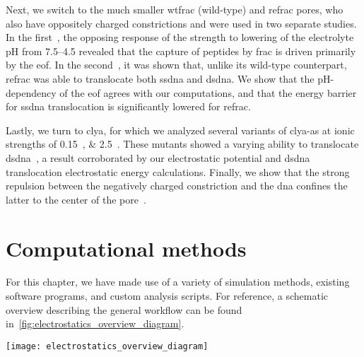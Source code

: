 Next, we switch to the much smaller \gls{wtfrac} (wild-type) and \gls{refrac} pores, who also have oppositely
charged constrictions and were used in two separate studies. In the first~\cite{Huang-2017}, the opposing
response of the  strength to lowering of the electrolyte pH from \numrange{7.5}{4.5} revealed
that the capture of peptides by \gls{frac} is driven primarily by the \gls{eof}. In the
second~\cite{Wloka-2016}, it was shown that, unlike its wild-type counterpart, \gls{refrac} was able to
translocate both \gls{ssdna} and \gls{dsdna}. We show that the pH-dependency of the \gls{eof} agrees with our
computations, and that the energy barrier for \gls{ssdna} translocation is significantly lowered for
\gls{refrac}.

Lastly, we turn to \gls{clya}, for which we analyzed several variants of \gls{clya-as} at ionic strengths of
\SIlist{0.15;2.5}{\Molar}. These mutants showed a varying ability to translocate
\gls{dsdna}~\cite{Franceschini-2016}, a result corroborated by our electrostatic potential and \gls{dsdna}
translocation electrostatic energy calculations. Finally, we show that the strong repulsion between the
negatively charged constriction and the \gls{dna} confines the latter to the center of the
pore~\cite{Bayoumi-2020}.


%
%
\clearpage
%
%


%
%
\section{Computational methods}
%
\label{sec:elec:methods}
%

For this chapter, we have made use of a variety of simulation methods, existing software programs, and custom
analysis scripts. For reference, a schematic overview describing the general workflow can be found
in~\cref{fig:electrostatics_overview_diagram}.

%
\begin{figure*}[b]
  \centering
  
  \texttt{[image: electrostatics\_overview\_diagram]}

\caption[Diagram of the electrostatic simulation methodology]{%
  \textbf{Diagram of the electrostatic simulation methodology.}
  Overview of the molecular modeling, electrostatic simulation, and data analysis steps performed within this
  chapter.
  }\label{fig:electrostatics_overview_diagram}
\end{figure*}
%

%
%
\clearpage
%
%


